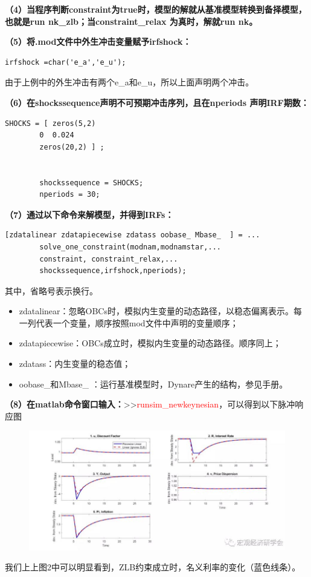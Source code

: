 \documentclass[cn,10pt,math=newtx,citestyle=gb7714-2015,bibstyle=gb7714-2015]{elegantbook}
\begin{document}
\begin{itemize}
	\textbf{（4）当程序判断constraint为true时，模型的解就从基准模型转换到备择模型，也就是run  nk\_zlb；当constraint\_relax 为真时，解就run nk。}
	
	\textbf{（5）将.mod文件中外生冲击变量赋予irfshock：}
	
	\begin{lstlisting}[frame=shadowbox]
		irfshock =char('e_a','e_u');
	\end{lstlisting}
	
	由于上例中的外生冲击有两个e\_a和e\_u，所以上面声明两个冲击。
	
	\textbf{（6）在shockssequence声明不可预期冲击序列，且在nperiods 声明IRF期数：}
	
	\begin{lstlisting}[frame=shadowbox]
		SHOCKS = [ zeros(5,2)
		0  0.024
		zeros(20,2) ] ;
		
		
		shockssequence = SHOCKS;
		nperiods = 30;
	\end{lstlisting}
	
	\textbf{（7）通过以下命令来解模型，并得到IRFs：}
	
	\begin{lstlisting}[frame=shadowbox]
		[zdatalinear zdatapiecewise zdatass oobase_ Mbase_  ] = ...
		solve_one_constraint(modnam,modnamstar,...
		constraint, constraint_relax,...
		shockssequence,irfshock,nperiods);
	\end{lstlisting}
	
	其中，省略号表示换行。
	\begin{itemize}
		\item zdatalinear：忽略OBCs时，模拟内生变量的动态路径，以稳态偏离表示。每一列代表一个变量，顺序按照mod文件中声明的变量顺序；
		
		\item zdatapiecewise：OBCs成立时，模拟内生变量的动态路径。顺序同上；
		
		\item zdatass：内生变量的稳态值；
		
		\item oobase\_和Mbase\_ ：运行基准模型时，Dynare产生的结构，参见手册。
	\end{itemize}
	
	\textbf{（8）在matlab命令窗口输入：}>>\textcolor{red}{runsim\_newkeynesian}，可以得到以下脉冲响应图
	
	
	\begin{figure}[htbp!]
		\centering
		\includegraphics[width=0.8\linewidth]{FIG/occbinirf}
		\centering
	\end{figure}
	
	我们上上图2中可以明显看到，ZLB约束成立时，名义利率的变化（蓝色线条）。
\end{itemize}
\end{document}
